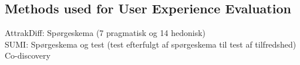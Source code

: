 \subsection{Methods used for User Experience Evaluation}
AttrakDiff: Spørgeskema (7 pragmatisk og 14 hedonisk) \\
SUMI: Spørgeskema og test (test efterfulgt af spørgeskema til test af tilfredshed)  \\
Co-discovery